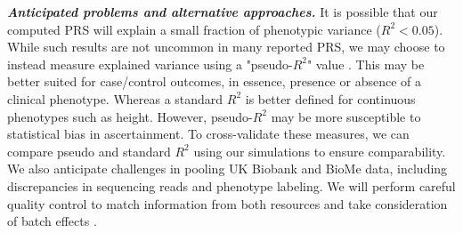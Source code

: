 \documentclass[11pt]{article}  %
\newlength\tindent
\renewcommand{\indent}{\hspace*{\tindent}}
\begin{document}
\indent \textbf{\textit{Anticipated problems and alternative approaches.}} It is possible that our computed PRS will explain a small fraction of phenotypic variance ($R^2 < 0.05$). While such results are not uncommon in many reported PRS, we may choose to instead measure explained variance using a "pseudo-$R^2$" value \cite{choi_tutorial_2020}. This may be better suited for case/control outcomes, in essence, presence or absence of a clinical phenotype. Whereas a standard $R^2$ is better defined for continuous phenotypes such as height. However, pseudo-$R^2$ may be more susceptible to statistical bias in ascertainment. To cross-validate these measures, we can compare pseudo and standard $R^2$ using our simulations to ensure comparability. We also anticipate challenges in pooling UK Biobank and BioMe data, including discrepancies in sequencing reads and phenotype labeling. We will perform careful quality control to match information from both resources and take consideration of batch effects \cite{gilad_reanalysis_2015}.  






\newpage

\end{document}
